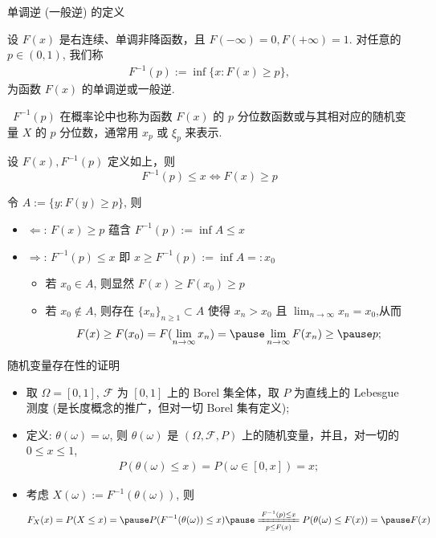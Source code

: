 \documentclass[Prob-All.tex]{subfiles}
\begin{document}
 \begin{frame}{单调逆 (一般逆) 的定义}
	 \vspace{-0.1cm}
	 \begin{defi}
		 设 $F (x)$ 是右连续、单调非降函数，且 $F (-\infty)=0, F (+\infty)=1$. 对任意的 $p\in (0,1)$, 我们称
		 \begin{eqnarray*}
			 F^{-1}(p):=\inf\{x: F(x)\geq p\}, %
		 \end{eqnarray*}
		 为函数 $F (x)$ 的单调逆或一般逆.
	 \end{defi}

 \pause
 \begin{rmk} \ 	 $F^{-1}(p)$ 在概率论中也称为函数 $F (x)$ 的 $p$ 分位数函数或与其相对应的随机变量 $X$ 的 $p$ 分位数，通常用 $x_p$ 或 $\xi_p$ 来表示.
 \end{rmk}
 \begin{thm}
	 设 $F (x), F^{-1}(p)$ 定义如上，则
	 \[F^{-1}(p)\leq x \Leftrightarrow F(x)\ge p \]
 \end{thm}
 \pause
 \zheng 令 $A:=\{y: F (y)\geq p\}$, 则 \pause
 \begin{itemize}[<+-|alert@+>]
	 \item $\Leftarrow$: $F (x)\geq p$ 蕴含 \pause $F^{-1}(p):=\inf A\leq x$\pause
	 \item $\Rightarrow$: $F^{-1}(p)\leq x$ 即 $x\geq F^{-1}(p):=\inf A=:x_0$\pause
	 \begin{itemize}[<+-|alert@+>]
		 \item 若 $x_0\in A$, 则显然 \pause $F (x)\geq F (x_0)\geq p$\pause
		 \item 若 $x_0\notin A$, 则存在 \pause $\{x_n\}_{n\geq 1}\subset A$ 使得 $x_n>x_0$ 且 $\lim_{n\rightarrow \infty} x_n=x_0$,\pause  从而 \pause
		 \[F(x)\geq F(x_0)=F(\lim_{n\rightarrow \infty}x_n)=\pause \lim_{n\rightarrow \infty}F(x_n)\geq\pause p;\]
	 \end{itemize}
 \end{itemize}
 \end{frame}
 \begin{frame}{随机变量存在性的证明}
 \pause
 \begin{itemize}[<+-|alert@+>]
	 \item 取 $\Omega=[0,1]$, $\mathcal{F}$ 为 $[0,1]$ 上的 Borel 集全体，取 $P$ 为直线上的 Lebesgue 测度 (是长度概念的推广，但对一切 Borel 集有定义);
	 \item 定义: $\theta (\omega)=\omega$, 则 $\theta (\omega)$ 是 $(\Omega,\mathcal{F},P)$ 上的随机变量，并且，对一切的 $0\le x\le 1$,
	 \begin{eqnarray*}
		 P(\theta(\omega)\le x)=P(\omega\in[0,x])=x;
	 \end{eqnarray*}
	 \item 考虑 $X (\omega):=F^{-1}(\theta (\omega))$, 则
	{\small\begin{eqnarray*}
			 F_X(x)=P(X\le x)=\pause P(F^{-1}(\theta(\omega))\le x)\pause \xlongequal[p\le F(x)]{F^{-1}(p)\le x} P(\theta(\omega)\le F(x))=\pause F(x)
	 \end{eqnarray*}}


 \end{itemize}


 \end{frame}
\end{document}
